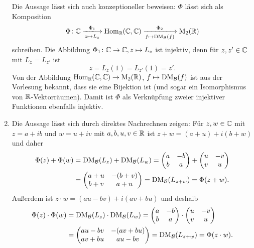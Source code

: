 \begin{solution}
\begin{enumerate}
   Die Aussage lässt sich auch konzeptioneller beweisen: $\Phi$ lässt sich als Komposition
   \[
    \Phi \colon
    \C
    \xlongrightarrow[z \mapsto L_z]{\Phi_1}
    \Hom_\R(\C,\C)
    \xlongrightarrow[f \mapsto \DM_\mc{B}(f)]{\Phi_2}
    \Mat_2(\R)
   \]
   schreiben. Die Abbildung $\Phi_1 \colon \mathbb{C} \to \mathbb{C}, z \mapsto L_z$ ist injektiv, denn für $z, z' \in \mathbb{C}$ mit $L_z = L_{z'}$ ist
   \[
    z = L_z(1) = L_{z'}(1) = z'.
   \]
   Von der Abbildung $\operatorname{Hom}_{\mathbb{R}}(\mathbb{C},\mathbb{C}) \to \operatorname{M}_2(\mathbb{R})$, $f \mapsto \operatorname{DM}_{\mathcal{B}}(f)$ ist aus der Vorlesung bekannt, dass sie eine Bijektion ist (und sogar ein Isomorphismus von $\mathbb{R}$-Vektorräumen). Damit ist $\Phi$ als Verknüpfung zweier injektiver Funktionen ebenfalls injektiv.
  \item
   Die Aussage lässt sich durch direktes Nachrechnen zeigen: Für $z, w \in \mathbb{C}$ mit $z = a + i b$ und $w = u + i v$ mit $a,b,u,v \in \mathbb{R}$ ist $z + w = (a + u) + i (b + w)$ und daher
   \begin{align*}
    \Phi(z) + \Phi(w)
    &= \operatorname{DM}_{\mathcal{B}}(L_z) + \operatorname{DM}_{\mathcal{B}}(L_w)
    = \begin{pmatrix} a & -b \\ b & a \end{pmatrix} + \begin{pmatrix} u & -v \\ v & u \end{pmatrix} \\
    &= \begin{pmatrix} a + u & -(b + v) \\ b + v & a + u \end{pmatrix} 
    = \operatorname{DM}_{\mathcal{B}}(L_{z+w})
    = \Phi(z+w).
   \end{align*}
   Außerdem ist $z \cdot w = (a u - b v) + i (a v + b u)$ und deshalb
   \begin{align*}
    \Phi(z) \cdot \Phi(w)
    &= \operatorname{DM}_{\mathcal{B}}(L_z) \cdot \operatorname{DM}_{\mathcal{B}}(L_w)
    = \begin{pmatrix} a & -b \\ b & a \end{pmatrix} \cdot \begin{pmatrix} u & -v \\ v & u \end{pmatrix} \\
    &= \begin{pmatrix} a u - b v & - (a v + b u) \\ a v + b u & a u - b v \end{pmatrix} 
    = \operatorname{DM}_{\mathcal{B}}(L_{z+w})
    = \Phi(z \cdot w).
   \end{align*}
   

\end{enumerate}
\end{solution}

